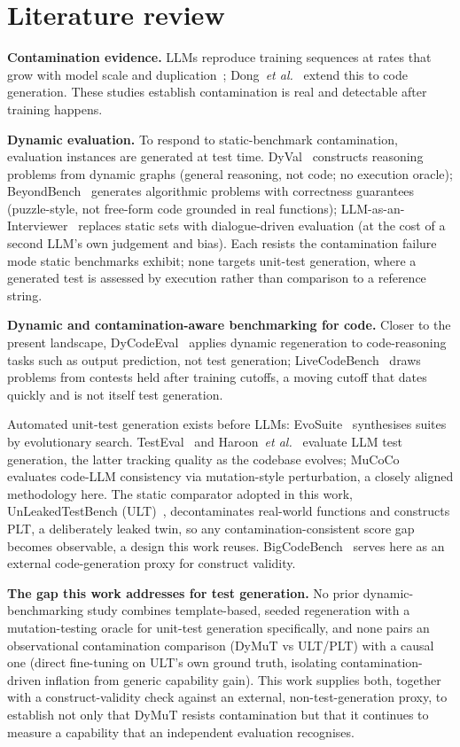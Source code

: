 \section{Literature review}
\label{sec:related-work}

\textbf{Contamination evidence.} LLMs reproduce training sequences at rates that grow with model scale and duplication~\cite{carlini2023quantifying}; Dong~\emph{et al.}~\cite{dong2026generalization} extend this to code generation. These studies establish contamination is real and detectable after training happens.

\textbf{Dynamic evaluation.} To respond to static-benchmark contamination, evaluation instances are generated at test time. DyVal~\cite{zhu2024dyval} constructs reasoning problems from dynamic graphs (general reasoning, not code; no execution oracle); BeyondBench~\cite{srivastava2026beyondbench} generates algorithmic problems with correctness guarantees (puzzle-style, not free-form code grounded in real functions); LLM-as-an-Interviewer~\cite{kim2025interviewer} replaces static sets with dialogue-driven evaluation (at the cost of a second LLM's own judgement and bias). Each resists the contamination failure mode static benchmarks exhibit; none targets unit-test generation, where a generated test is assessed by execution rather than comparison to a reference string.

\textbf{Dynamic and contamination-aware benchmarking for code.} Closer to the present landscape, DyCodeEval~\cite{chen2025dycodeeval} applies dynamic regeneration to code-reasoning tasks such as output prediction, not test generation; LiveCodeBench~\cite{jain2025livecodebench} draws problems from contests held after training cutoffs, a moving cutoff that dates quickly and is not itself test generation.

Automated unit-test generation exists before LLMs: EvoSuite~\cite{fraser2011evosuite} synthesises suites by evolutionary search. TestEval~\cite{wang2024testeval} and Haroon~\emph{et al.}~\cite{haroon2026evolution} evaluate LLM test generation, the latter tracking quality as the codebase evolves; MuCoCo~\cite{chou2026mucoco} evaluates code-LLM consistency via mutation-style perturbation, a closely aligned methodology here. The static comparator adopted in this work, UnLeakedTestBench (ULT)~\cite{huang2026ult}, decontaminates real-world functions and constructs PLT, a deliberately leaked twin, so any contamination-consistent score gap becomes observable, a design this work reuses. BigCodeBench~\cite{zhuo2025bigcodebench} serves here as an external code-generation proxy for construct validity.

\textbf{The gap this work addresses for test generation.} No prior dynamic-benchmarking study combines template-based, seeded regeneration with a mutation-testing oracle for unit-test generation specifically, and none pairs an observational contamination comparison (DyMuT vs ULT/PLT) with a causal one (direct fine-tuning on ULT's own ground truth, isolating contamination-driven inflation from generic capability gain). This work supplies both, together with a construct-validity check against an external, non-test-generation proxy, to establish not only that DyMuT resists contamination but that it continues to measure a capability that an independent evaluation recognises.
